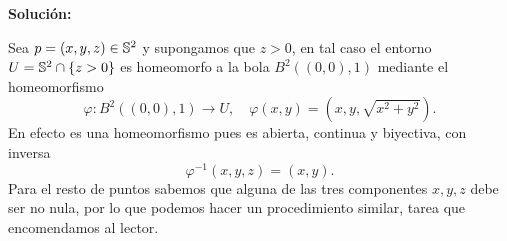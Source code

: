 
\noindent\textbf{Solución:}

  Sea $p=(x,y,z)\in\mathbb{S}^2$ y supongamos que $z>0$, en tal caso el entorno $U=\mathbb{S}^2\cap\{z>0\}$ es homeomorfo a la bola $B^2((0,0),1)$ mediante el homeomorfismo
  \[
  \varphi:B^2((0,0),1)\to U,\quad \varphi(x,y)=(x,y,\sqrt{x^2+y^2}).
  \]
  En efecto es una homeomorfismo pues es abierta, continua y biyectiva, con inversa
  \[
  \varphi^{-1}(x,y,z)=(x,y).
  \]
  Para el resto de puntos sabemos que alguna de las tres componentes $x,y,z$ debe ser no nula, por lo que podemos hacer un procedimiento similar, tarea que encomendamos al lector.








\clearpage %

